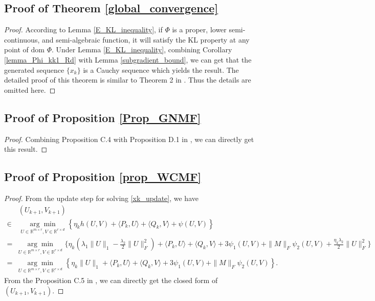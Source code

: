 \documentclass[letterpaper]{article} %
\begin{document}
	\subsection{Proof of  Theorem \ref{global_convergence}}
	\begin{proof}
		According to Lemma \ref{E_KL_inequality}, if $\Phi$ is a proper, lower semi-continuous, and semi-algebraic function, it will satisfy the
		KL property at any point of $\text{dom }\Phi$. Under Lemma \ref{E_KL_inequality}, combining Corollary \ref{lemma_Phi_kk1_Rd} with Lemma \ref{subgradient_bound}, we can get that the generated sequence
		$\{x_{k}\}$ is a Cauchy sequence which yields the result. The detailed proof of this theorem is similar to Theorem 2 in \cite{WangH23}. Thus the details are omitted here.
	\end{proof}

	\subsection{Proof of Proposition \ref{Prop_GNMF}}
	\begin{proof}
		Combining Proposition C.4 with Proposition D.1 in \cite{MukkamalaO19}, we can directly get this result.
	\end{proof}

	\subsection{Proof of  Proposition \ref{prop_WCMF}}
	\begin{proof}
		From the  update step for solving \eqref{xk_update}, we have
		\begin{align*}
			&(U_{k+1},V_{k+1})\\
			\in&\,\,\underset{U\in\mathbb{R}^{m\times r},V\in\mathbb{R}^{r\times d}}{\arg\min}\,\,\left\{\eta_{k} h(U,V)+\langle P_{k},U\rangle+\langle Q_{k},V\rangle+\psi(U,V)\right\}\\
			=&\underset{U\in\mathbb{R}^{m\times r},V\in\mathbb{R}^{r\times d}}{\arg\min}\,\,\Big\{\eta_{k}\left(\lambda_{1}\|U\|_{1}-\frac{\lambda_{2}}{2}\|U\|_{F}^{2}\right)+\langle P_{k},U\rangle+\langle Q_{k},V\rangle
			+3\psi_{1}(U,V)+\|M\|_{F}\psi_{2}(U,V)+\frac{\eta_{k}\lambda_{2}}{2}\|U\|_{F}^{2}\Big\}\\
			=&\underset{U\in\mathbb{R}^{m\times r},V\in\mathbb{R}^{r\times d}}{\arg\min}\,\,\left\{\eta_{k}\|U\|_{1}+\langle P_{k},U\rangle+\langle Q_{k},V\rangle+3\psi_{1}(U,V)+\|M\|_{F}\psi_{2}(U,V)\right\}.
		\end{align*}
		From the Proposition C.5 in \cite{MukkamalaO19}, we can directly get the closed form of $(U_{k+1},V_{k+1})$.
	\end{proof}
\end{document}
